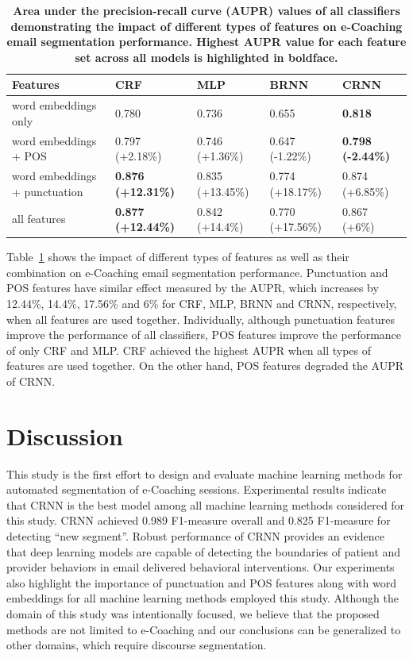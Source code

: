 \documentclass{amia}
\begin{document}
\begin{table}[ht]
\centering
\caption{\textbf{Area under the precision-recall curve (AUPR) values of all classifiers demonstrating the impact of different types of features on e-Coaching email segmentation performance. Highest AUPR value for each feature set across all models is highlighted in boldface.}}
\label{tab:result_aupr}
 \begin{tabular}{|l|l|l|l|l|}
  \hline
\textbf{Features} & \textbf{CRF} & \textbf{MLP}  & \textbf{BRNN} & \textbf{CRNN} \\ \hline      
 word embeddings only & 0.780 & 0.736 & 0.655 & \textbf{0.818} \\ \hline
 word embeddings + POS & 0.797 (+2.18\%) & 0.746 (+1.36\%) & 0.647 (-1.22\%) & \textbf{0.798 (-2.44\%)} \\ \hline
 word embeddings + punctuation & \textbf{0.876 (+12.31\%)} & 0.835 (+13.45\%) & 0.774 (+18.17\%) & 0.874 (+6.85\%) \\ \hline
 all features & \textbf{0.877 (+12.44\%)} & 0.842 (+14.4\%) & 0.770 (+17.56\%) & 0.867 (+6\%) \\ \hline
  \end{tabular}
\end{table}     

Table~\ref{tab:result_aupr} shows the impact of different types of features as well as their combination on e-Coaching email segmentation performance. Punctuation and POS features have similar effect measured by the AUPR, which increases by 12.44\%, 14.4\%, 17.56\% and 6\% for CRF, MLP, BRNN and CRNN, respectively, when all features are used together. Individually, although punctuation features improve the performance of all classifiers, POS features improve the performance of only CRF and MLP. CRF achieved the highest AUPR when all types of features are used together. On the other hand, POS features degraded the AUPR of CRNN.

\section*{Discussion}
This study is the first effort to design and evaluate machine learning methods for automated segmentation of e-Coaching sessions. Experimental results indicate that CRNN is the best model among all machine learning methods considered for this study. CRNN achieved 0.989 F1-measure overall and 0.825 F1-measure for detecting ``new segment''. Robust performance of CRNN provides an evidence that deep learning models are capable of detecting the boundaries of patient and provider behaviors in email delivered behavioral interventions. Our experiments also highlight the importance of punctuation and POS features along with word embeddings for all machine learning methods employed this study. Although the domain of this study was intentionally focused, we believe that the proposed methods are not limited to e-Coaching and our conclusions can be generalized to other domains, which require discourse segmentation.
\end{document}
